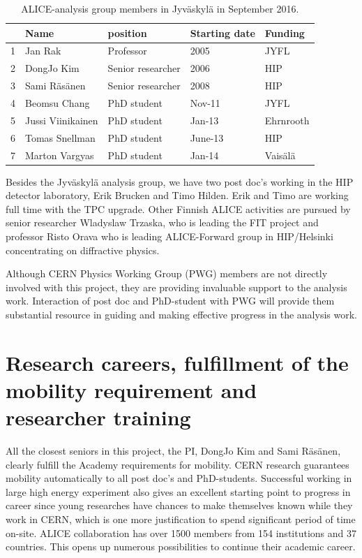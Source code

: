\begin{table}[htp]
\caption{ALICE-analysis group members in Jyv\"askyl\"a in September 2016.}
\begin{center}
\begin{tabular}{|l|l|l|l|l|}
\hline
   &  Name                       &  position         & Starting date & Funding \\
\hline
1 &    Jan  Rak                  & Professor       &  2005           & JYFL \\
2 &    DongJo   Kim          & Senior researcher     &  2006           & HIP \\
3 &    Sami   R\"as\"anen & Senior researcher     &  2008           & HIP \\
 \hline
4 &    Beomsu   Chang     & PhD student   &  Nov-11       & JYFL \\
5 &    Jussi   Viinikainen   & PhD student   & Jan-13         &  Ehrnrooth   \\
6 &    Tomas Snellman     & PhD student   & June-13       & HIP\\
7 &    Marton Vargyas      & PhD student   & Jan-14         & Vais\"al\"a\\
\hline
\end{tabular}
\end{center}
\label{tab:personnel}
\end{table}%

Besides the Jyv\"askyl\"a analysis group, we have two post doc's working in the HIP detector laboratory, Erik Brucken and Timo Hilden. Erik and Timo are working full time with the TPC upgrade. Other Finnish ALICE activities are pursued by senior researcher Wladyslaw Trzaska, who is leading the FIT project and professor Risto Orava who is leading ALICE-Forward group in HIP/Helsinki concentrating on diffractive physics.

Although CERN Physics Working Group (PWG) members are not directly involved with this project, they are providing invaluable support to the analysis work. Interaction of post doc and PhD-student with PWG will provide them substantial resource in guiding and making effective progress in the analysis work.

\section{Research careers, fulfillment of the mobility requirement and researcher training}%
\label{sec:career}

All the closest seniors in this project, the PI, DongJo Kim and Sami R\"as\"anen, clearly fulfill the Academy requirements for mobility. CERN research guarantees mobility automatically to all post doc's and PhD-students. Successful working in large high energy experiment also gives an excellent starting point to progress in career since young researches have chances to make themselves known while they work in CERN, which is one more justification to spend significant period of time on-site. ALICE collaboration has over 1500 members from 154 institutions and 37 countries. This opens up numerous possibilities to continue their academic career.

